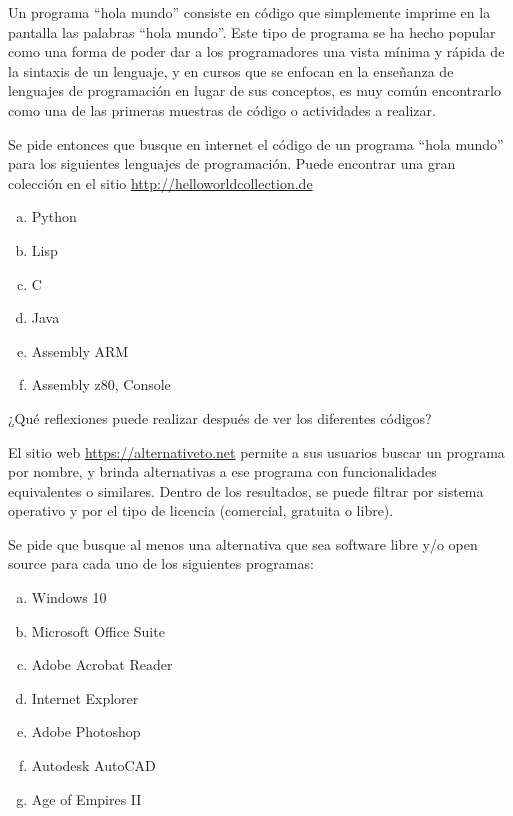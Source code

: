 \begin{exercise}
Un programa ``hola mundo'' consiste en código que simplemente imprime en la
pantalla las palabras ``hola mundo''. Este tipo de programa se ha hecho popular
como una forma de poder dar a los programadores una vista mínima y rápida de
la sintaxis de un lenguaje, y en cursos que se enfocan en la enseñanza de lenguajes
de programación en lugar de sus conceptos, es muy común encontrarlo como una de
las primeras muestras de código o actividades a realizar.

Se pide entonces que busque en internet el código de un programa ``hola mundo''
para los siguientes lenguajes de programación. Puede encontrar una gran colección
en el sitio \href{http://helloworldcollection.de}{http://helloworldcollection.de}

\begin{enumerate}[a)]
    \item Python
    \item Lisp
    \item C
    \item Java
    \item Assembly ARM
    \item Assembly z80, Console
\end{enumerate}

¿Qué reflexiones puede realizar después de ver los diferentes códigos?
\end{exercise}

\begin{exercise}
El sitio web \href{https://alternativeto.net}{https://alternativeto.net} permite
a sus usuarios buscar un programa por nombre, y brinda alternativas a ese programa
con funcionalidades equivalentes o similares. Dentro de los resultados, se puede
filtrar por sistema operativo y por el tipo de licencia (comercial, gratuita o libre).

Se pide que busque al menos una alternativa que sea software libre y/o open
source para cada uno de los siguientes programas:
\begin{enumerate}[a)]
    \item Windows 10
    \item Microsoft Office Suite
    \item Adobe Acrobat Reader
    \item Internet Explorer
    \item Adobe Photoshop
    \item Autodesk AutoCAD
    \item Age of Empires II
\end{enumerate}
\end{exercise}